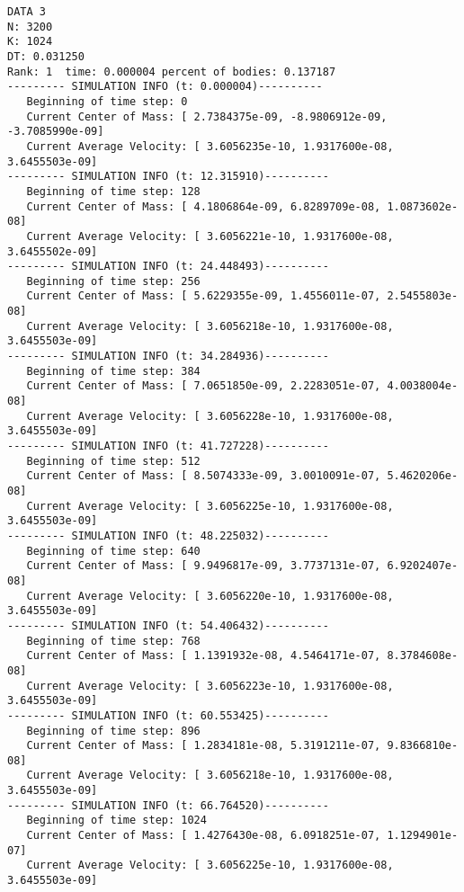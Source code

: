 \documentclass[11pt]{article}
\begin{document}
\begin{verbatim}
DATA 3
N: 3200
K: 1024
DT: 0.031250
Rank: 1  time: 0.000004 percent of bodies: 0.137187
--------- SIMULATION INFO (t: 0.000004)----------
   Beginning of time step: 0
   Current Center of Mass: [ 2.7384375e-09, -8.9806912e-09, -3.7085990e-09]
   Current Average Velocity: [ 3.6056235e-10, 1.9317600e-08, 3.6455503e-09]
--------- SIMULATION INFO (t: 12.315910)----------
   Beginning of time step: 128
   Current Center of Mass: [ 4.1806864e-09, 6.8289709e-08, 1.0873602e-08]
   Current Average Velocity: [ 3.6056221e-10, 1.9317600e-08, 3.6455502e-09]
--------- SIMULATION INFO (t: 24.448493)----------
   Beginning of time step: 256
   Current Center of Mass: [ 5.6229355e-09, 1.4556011e-07, 2.5455803e-08]
   Current Average Velocity: [ 3.6056218e-10, 1.9317600e-08, 3.6455503e-09]
--------- SIMULATION INFO (t: 34.284936)----------
   Beginning of time step: 384
   Current Center of Mass: [ 7.0651850e-09, 2.2283051e-07, 4.0038004e-08]
   Current Average Velocity: [ 3.6056228e-10, 1.9317600e-08, 3.6455503e-09]
--------- SIMULATION INFO (t: 41.727228)----------
   Beginning of time step: 512
   Current Center of Mass: [ 8.5074333e-09, 3.0010091e-07, 5.4620206e-08]
   Current Average Velocity: [ 3.6056225e-10, 1.9317600e-08, 3.6455503e-09]
--------- SIMULATION INFO (t: 48.225032)----------
   Beginning of time step: 640
   Current Center of Mass: [ 9.9496817e-09, 3.7737131e-07, 6.9202407e-08]
   Current Average Velocity: [ 3.6056220e-10, 1.9317600e-08, 3.6455503e-09]
--------- SIMULATION INFO (t: 54.406432)----------
   Beginning of time step: 768
   Current Center of Mass: [ 1.1391932e-08, 4.5464171e-07, 8.3784608e-08]
   Current Average Velocity: [ 3.6056223e-10, 1.9317600e-08, 3.6455503e-09]
--------- SIMULATION INFO (t: 60.553425)----------
   Beginning of time step: 896
   Current Center of Mass: [ 1.2834181e-08, 5.3191211e-07, 9.8366810e-08]
   Current Average Velocity: [ 3.6056218e-10, 1.9317600e-08, 3.6455503e-09]
--------- SIMULATION INFO (t: 66.764520)----------
   Beginning of time step: 1024
   Current Center of Mass: [ 1.4276430e-08, 6.0918251e-07, 1.1294901e-07]
   Current Average Velocity: [ 3.6056225e-10, 1.9317600e-08, 3.6455503e-09]


\end{verbatim}
\end{document}

